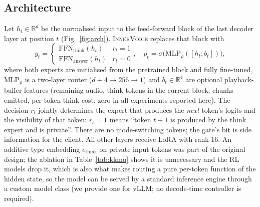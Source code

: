 \documentclass[letterpaper]{article} %
\newcommand{\iv}{\textsc{InnerVoice}}
\begin{document}
\subsection{Architecture}
Let $h_t\in\mathbb{R}^d$ be the normalised input to the feed-forward block of the last decoder layer at position $t$ (Fig.~\ref{fig:arch}). \iv{} replaces that block with
\begin{equation}
y_t = \begin{cases} \mathrm{FFN}_{\text{think}}(h_t) & r_t = 1 \\ \mathrm{FFN}_{\text{answer}}(h_t) & r_t = 0 \end{cases},\quad
p_t = \sigma\!\big(\mathrm{MLP}_\rho([h_t; b_t])\big),
\end{equation}
where both experts are initialised from the pretrained block and fully fine-tuned, $\mathrm{MLP}_\rho$ is a two-layer router ($d{+}4 \to 256 \to 1$) and $b_t\in\mathbb{R}^4$ are optional playback-buffer features (remaining audio, think tokens in the current block, chunks emitted, per-token think cost; zero in all experiments reported here). The decision $r_t$ jointly determines the expert that produces the \emph{next} token's logits and the visibility of that token: $r_t{=}1$ means ``token $t{+}1$ is produced by the think expert and is private''. There are no mode-switching tokens; the gate's bit is side information for the client. All other layers receive LoRA \citep{hu2022lora} with rank 16. An additive type embedding $e_{\text{think}}$ on private input tokens was part of the original design; the ablation in Table~\ref{tab:kkmq} shows it is unnecessary and the RL models drop it, which is also what makes routing a pure per-token function of the hidden state, so the model can be served by a standard inference engine through a custom model class (we provide one for vLLM; no decode-time controller is required).
\end{document}
